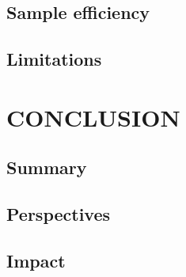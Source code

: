 \documentclass{article}
\begin{document}
\subsection{Sample efficiency}
\subsection{Limitations}

\section{CONCLUSION}
\subsection{Summary}
\subsection{Perspectives}
\subsection{Impact}
\blindtext
	
\end{document}
